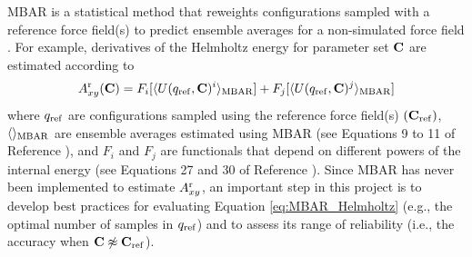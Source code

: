 \documentclass[12pt,a4paper]{article}
\newcommand{\bfm}[1]{{\bf #1}}
\newcommand{\C}{\bfm{C}}
\begin{document}

MBAR is a statistical method that reweights configurations sampled with a reference force field(s) to predict ensemble averages for a non-simulated force field \cite{shirts-chodera:jcp:2008:mbar,Messerly2018_1}. For example, derivatives of the Helmholtz energy for parameter set $\C$ are estimated according to 
\begin{equation} \label{eq:MBAR_Helmholtz}
A_{xy}^{\rm r}(\C) = F_i[\langle U(q_{\rm ref},\C)^i \rangle_{\rm MBAR}] + F_j[\langle U(q_{\rm ref},\C)^j \rangle_{\rm MBAR}]
\end{equation}
where $q_{\rm ref}$ are configurations sampled using the reference force field(s) $(\C_{\rm ref})$, $\langle\rangle_{\rm MBAR}$ are ensemble averages estimated using MBAR (see Equations 9 to 11 of Reference ), and $F_i$ and $F_j$ are functionals that depend on different powers of the internal energy (see Equations 27 and 30 of Reference ). Since MBAR has never been implemented to estimate $A_{xy}^{\rm r}$, an important step in this project is to develop best practices for evaluating Equation \ref{eq:MBAR_Helmholtz} (e.g., the optimal number of samples in $q_{\rm ref}$) and to assess its range of reliability (i.e., the accuracy when $\C \not\approx \C_{\rm ref}$).

\end{document}
